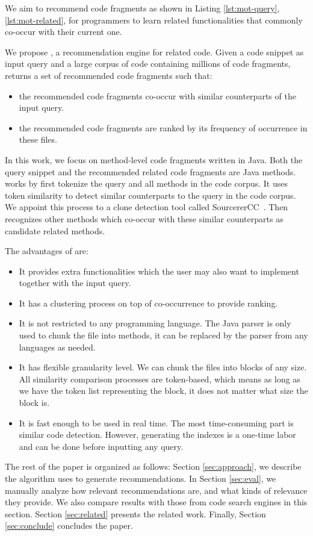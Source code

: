 We aim to recommend code fragments as shown in Listing \ref{lst:mot-query}, \ref{lst:mot-related}, for programmers to learn related functionalities that commonly co-occur with their current one.

We propose {\tool}, a recommendation engine for related code. Given a code snippet as input query and a large corpus of code containing millions of code fragments, {\tool} returns a set of recommended code fragments such that:
\begin{itemize}
	\item the recommended code fragments co-occur with similar counterparts of the input query.
	\item the recommended code fragments are ranked by its frequency of occurrence in these files.
\end{itemize}


In this work, we focus on method-level code fragments written in Java. Both the query snippet and the recommended related code fragments are Java methods. {\tool} works by first tokenize the query and all methods in the code corpus. It uses token similarity to detect similar counterparts to the query in the code corpus. We appoint this process to a clone detection tool called SourcererCC~\cite{sajnani2016sourcerercc}. Then {\tool} recognizes other methods which co-occur with these similar counterparts as candidate related methods. 

The advantages of {\tool} are:
\begin{itemize}
	\item It provides extra functionalities which the user may also want to implement together with the input query.
	\item It has a clustering process on top of co-occurrence to provide ranking.
	\item It is not restricted to any programming language. The Java parser is only used to chunk the file into methods, it can be replaced by the parser from any languages as needed.
	\item It has flexible granularity level. We can chunk the files into blocks of any size. All similarity comparison processes are token-based, which means as long as we have the token list representing the block, it does not matter what size the block is.
	\item It is fast enough to be used in real time. The most time-consuming part is similar code detection. However, generating the indexes is a one-time labor and can be done before inputting any query.	
\end{itemize}

The rest of the paper is organized as follows: Section \ref{sec:approach}, we describe the algorithm {\tool} uses to generate recommendations. In Section \ref{sec:eval}, we manually analyze how relevant {\tool} recommendations are, and what kinds of relevance they provide. We also compare {\tool} results with those from code search engines in this section. Section \ref{sec:related} presents the related work. Finally, Section \ref{sec:conclude} concludes the paper.
